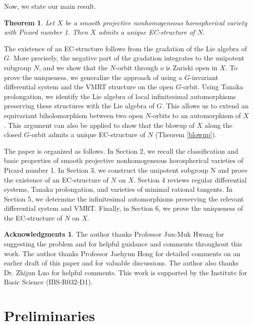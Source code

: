 \documentclass{amsart}
\newtheorem{theorem}{Theorem}
\theoremstyle{definition}
\newtheorem*{acknowledgments}{Acknowledgments}
\theoremstyle{remark}
\begin{document}
Now, we state our main result.

\begin{theorem}
\label{main}
Let $X$ be a smooth projective nonhomogeneous horospherical variety with Picard number 1. Then $X$ admits a unique EC-structure of $N$.
\end{theorem}

The existence of an EC-structure follows from the gradation of the Lie algebra of $G$. More precisely, the negative part of the gradation integrates to the unipotent subgroup $N$, and we show that the $N$-orbit through $o$ is Zariski open in $X$. To prove the uniqueness, we generalize the approach of \cite{C} using a $G$-invariant differential system and the VMRT structure on the open $G$-orbit. Using Tanaka prolongation, we identify the Lie algebra of local infinitesimal automorphisms preserving these structures with the Lie algebra of $G$. This allows us to extend an equivariant biholomorphism between two open $N$-orbits to an automorphism of $X$. This argument can also be applied to show that the blowup of $X$ along the closed $G$-orbit admits a unique EC-structure of $N$ (Theorem \ref{blowup}).


The paper is organized as follows. In Section 2, we recall the classification and basic properties of smooth projective nonhomogeneous horospherical varieties of Picard number 1. In Section 3, we construct the unipotent subgroup N and prove the existence of an EC-structure of $N$ on $X$. Section 4 reviews regular differential systems, Tanaka prolongation, and varieties of minimal rational tangents. In Section 5, we determine the infinitesimal automorphisms preserving the relevant differential system and VMRT. Finally, in Section 6, we prove the uniqueness of the EC-structure of $N$ on $X$.


\begin{acknowledgments}
The author thanks Professor Jun-Muk Hwang for suggesting the problem and for helpful guidance and comments throughout this work. The author thanks Professor Jaehyun Hong for detailed comments on an earlier draft of this paper and for valuable discussions. The author also thanks Dr. Zhijun Luo for helpful comments. This work is supported by the Institute for Basic Science (IBS-R032-D1).
\end{acknowledgments}


\section{Preliminaries}
\end{document}
